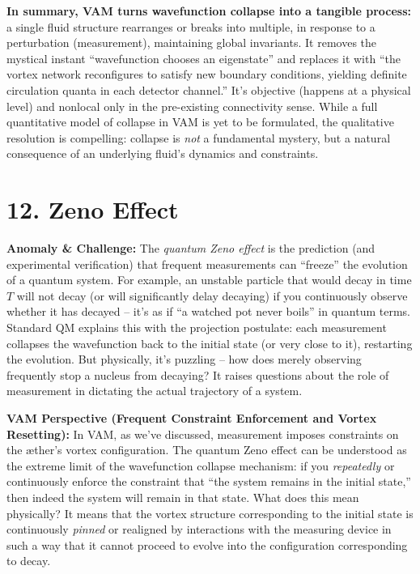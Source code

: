 \documentclass[a4paper, aps,preprint,superscriptaddress, 12pt]{revtex4}
\begin{document}
\textbf{In summary, VAM turns wavefunction collapse into a tangible process:} a single fluid structure rearranges or breaks into multiple, in response to a perturbation (measurement), maintaining global invariants. It removes the mystical instant “wavefunction chooses an eigenstate” and replaces it with “the vortex network reconfigures to satisfy new boundary conditions, yielding definite circulation quanta in each detector channel.” It’s objective (happens at a physical level) and nonlocal only in the pre-existing connectivity sense. While a full quantitative model of collapse in VAM is yet to be formulated, the qualitative resolution is compelling: collapse is \textit{not} a fundamental mystery, but a natural consequence of an underlying fluid’s dynamics and constraints.


\section*{12. Zeno Effect}

\textbf{Anomaly \& Challenge: } The \textit{quantum Zeno effect} is the prediction (and experimental verification) that frequent measurements can “freeze” the evolution of a quantum system. For example, an unstable particle that would decay in time $T$ will not decay (or will significantly delay decaying) if you continuously observe whether it has decayed – it’s as if “a watched pot never boils” in quantum terms. Standard QM explains this with the projection postulate: each measurement collapses the wavefunction back to the initial state (or very close to it), restarting the evolution. But physically, it’s puzzling – how does merely observing frequently stop a nucleus from decaying? It raises questions about the role of measurement in dictating the actual trajectory of a system.


\textbf{VAM Perspective (Frequent Constraint Enforcement and Vortex Resetting):} In VAM, as we’ve discussed, measurement imposes constraints on the æther’s vortex configuration. The quantum Zeno effect can be understood as the extreme limit of the wavefunction collapse mechanism: if you \textit{repeatedly} or continuously enforce the constraint that “the system remains in the initial state,” then indeed the system will remain in that state. What does this mean physically? It means that the vortex structure corresponding to the initial state is continuously \textit{pinned} or realigned by interactions with the measuring device in such a way that it cannot proceed to evolve into the configuration corresponding to decay.
\end{document}
